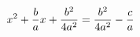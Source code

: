 \documentclass[preview]{standalone}
\begin{document}
\begin{align*}
\special{dvisvgm:raw <g id='unique000'>}x^2 + \frac{b}{a}x + \frac{b^2}{4a^2} = \frac{b^2}{4a^2} - \frac{c}{a}\special{dvisvgm:raw </g>}
\end{align*}
\end{document}
